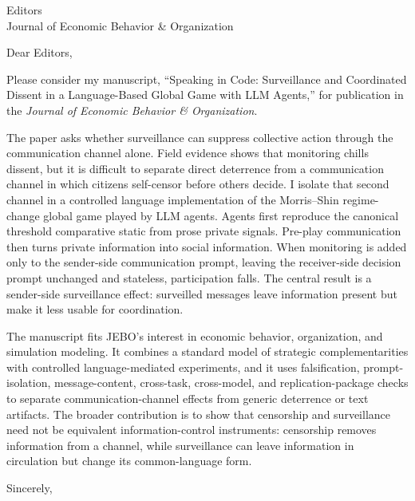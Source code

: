 \documentclass[11pt]{letter}
\begin{document}
\begin{letter}{Editors\\Journal of Economic Behavior \& Organization}

\opening{Dear Editors,}

Please consider my manuscript, ``Speaking in Code: Surveillance and Coordinated Dissent in a Language-Based Global Game with LLM Agents,'' for publication in the \textit{Journal of Economic Behavior \& Organization}.

The paper asks whether surveillance can suppress collective action through the communication channel alone. Field evidence shows that monitoring chills dissent, but it is difficult to separate direct deterrence from a communication channel in which citizens self-censor before others decide. I isolate that second channel in a controlled language implementation of the Morris--Shin regime-change global game played by LLM agents. Agents first reproduce the canonical threshold comparative static from prose private signals. Pre-play communication then turns private information into social information. When monitoring is added only to the sender-side communication prompt, leaving the receiver-side decision prompt unchanged and stateless, participation falls. The central result is a sender-side surveillance effect: surveilled messages leave information present but make it less usable for coordination.

The manuscript fits JEBO's interest in economic behavior, organization, and simulation modeling. It combines a standard model of strategic complementarities with controlled language-mediated experiments, and it uses falsification, prompt-isolation, message-content, cross-task, cross-model, and replication-package checks to separate communication-channel effects from generic deterrence or text artifacts. The broader contribution is to show that censorship and surveillance need not be equivalent information-control instruments: censorship removes information from a channel, while surveillance can leave information in circulation but change its common-language form.

\closing{Sincerely,}

\end{letter}
\end{document}
